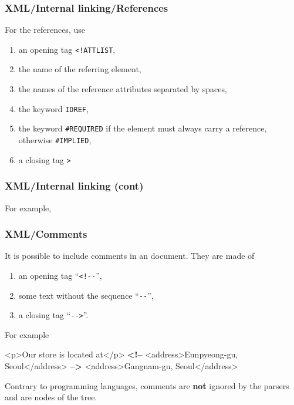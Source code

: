 %
\begin{frame}[containsverbatim]
\frametitle{XML/Internal linking/References}

For the references, use
\begin{enumerate}

  \item an opening tag \verb|<!ATTLIST|,

  \item the name of the referring element,

  \item the names of the reference attributes separated by spaces,

  \item the keyword \texttt{IDREF},

  \item the keyword \texttt{\#REQUIRED} if the element must always
    carry a reference, otherwise \texttt{\#IMPLIED},

  \item a closing tag \verb|>|

\end{enumerate}

\end{frame}

%
\begin{frame}
\frametitle{XML/Internal linking (cont)}
\label{xml_intro:id_idref}

For example,

\end{frame}

%
\begin{frame}[containsverbatim]
\frametitle{XML/Comments}

It is possible to include comments in an \XML document. They are made
of
\begin{enumerate}

  \item an opening tag ``\verb|<!--|'',

  \item some text without the sequence ``\verb|--|'',

  \item a closing tag ``\verb|-->|''.

\end{enumerate}
For example
{\small
\begin{semiverbatim}
<p>Our store is located at</p>
\textbf{<!--} <address>Eunpyeong-gu, Seoul</address> \textbf{-->}
<address>Gangnam-gu, Seoul</address>
\end{semiverbatim}
}
Contrary to programming languages, comments are \textbf{not} ignored
by the parsers and are nodes of the \XML tree.

\end{frame}

